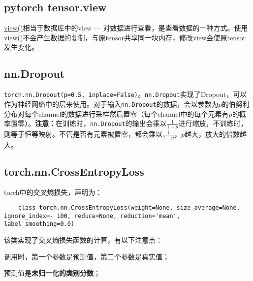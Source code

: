\subsection{pytorch tensor.view}
\href{https://pytorch.org/docs/stable/tensor_view.html}{view()}相当于数据库中的view --- 对数据进行查看，是查看数据的一种方式。使用view()不会产生数据的复制，与原tensor共享同一块内存，修改view会使原tensor发生变化。

\subsection{nn.Dropout}
\texttt{torch.nn.Dropout(p=0.5, inplace=False)}。\texttt{nn.Dropout}实现了Dropout，可以作为神经网络中的层来使用。对于输入\texttt{nn.Dropout}的数据，会以参数为$p$的伯努利分布对每个channel的数据进行采样然后置零（每个channel中的每个元素有$p$的概率置零）。\textbf{注意：}在训练时，\texttt{nn.Dropout}的输出会乘以$\frac{1}{1 - p}$进行缩放，不训练时，则等于恒等映射。不管是否有元素被置零，都会乘以$\frac{1}{1 - p}$，$p$越大，放大的倍数越大。

\subsection{torch.nn.CrossEntropyLoss}
torch中的交叉熵损失，声明为：
\begin{verbatim}
	class torch.nn.CrossEntropyLoss(weight=None, size_average=None, ignore_index=- 100, reduce=None, reduction='mean', label_smoothing=0.0)
\end{verbatim}

该类实现了交叉熵损失函数的计算，有以下注意点：
\begin{myitemize}
	\item 调用时，第一个参数是预测值，第二个参数是真实值；
	\item 预测值是\textbf{未归一化的类别分数}；
\end{myitemize}

